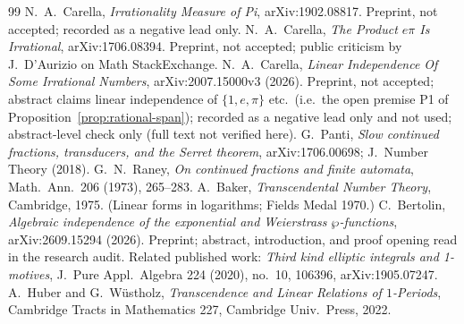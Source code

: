 \documentclass[11pt]{amsart}
\theoremstyle{definition}
\theoremstyle{remark}
\numberwithin{equation}{section}
\begin{document}
\begin{thebibliography}{99}
 N.~A.~Carella, \emph{Irrationality Measure of Pi}, arXiv:1902.08817. Preprint, not accepted; recorded as a negative lead only.
 N.~A.~Carella, \emph{The Product $e\pi$ Is Irrational}, arXiv:1706.08394. Preprint, not accepted; public criticism by J.~D'Aurizio on Math StackExchange.
 N.~A.~Carella, \emph{Linear Independence Of Some Irrational Numbers}, arXiv:2007.15000v3 (2026). Preprint, not accepted; abstract claims linear independence of $\{1,e,\pi\}$ etc.\ (i.e.\ the open premise P1 of Proposition~\ref{prop:rational-span}); recorded as a negative lead only and not used; abstract-level check only (full text not verified here).
 G.~Panti, \emph{Slow continued fractions, transducers, and the Serret theorem}, arXiv:1706.00698; J.~Number Theory (2018).
 G.~N.~Raney, \emph{On continued fractions and finite automata}, Math.~Ann.~206 (1973), 265--283.
 A.~Baker, \emph{Transcendental Number Theory}, Cambridge, 1975. (Linear forms in logarithms; Fields Medal 1970.)
 C.~Bertolin, \emph{Algebraic independence of the exponential and Weierstrass $\wp$-functions}, arXiv:2609.15294 (2026). Preprint; abstract, introduction, and proof opening read in the research audit. Related published work: \emph{Third kind elliptic integrals and 1-motives}, J.~Pure Appl.~Algebra 224 (2020), no.~10, 106396, arXiv:1905.07247.
 A.~Huber and G.~W\"ustholz, \emph{Transcendence and Linear Relations of $1$-Periods}, Cambridge Tracts in Mathematics 227, Cambridge Univ.~Press, 2022.


\end{thebibliography}
\end{document}
